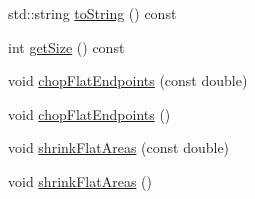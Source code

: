 \begin{DoxyCompactItemize}
std\+::string \hyperlink{class_opm_1_1_monot_cubic_interpolator_a2ee2475e52a42f3982e30c5f78cf70b3}{to\+String} () const 
\item 
int \hyperlink{class_opm_1_1_monot_cubic_interpolator_a5027415906f0bb1ea7d57f5456d7ab2b}{get\+Size} () const 
\item 
void \hyperlink{class_opm_1_1_monot_cubic_interpolator_a83a92d8a6e6bd6719ef9102af51ca74a}{chop\+Flat\+Endpoints} (const double)
\item 
void \hyperlink{class_opm_1_1_monot_cubic_interpolator_afd92b5866850437e66e01e092fc8f8b2}{chop\+Flat\+Endpoints} ()
\item 
void \hyperlink{class_opm_1_1_monot_cubic_interpolator_af953fcbdfb83802b103516eff55fb26e}{shrink\+Flat\+Areas} (const double)
\item 
void \hyperlink{class_opm_1_1_monot_cubic_interpolator_aa853561e3084f7d5220b958b8b9df9ae}{shrink\+Flat\+Areas} ()
\end{DoxyCompactItemize}
